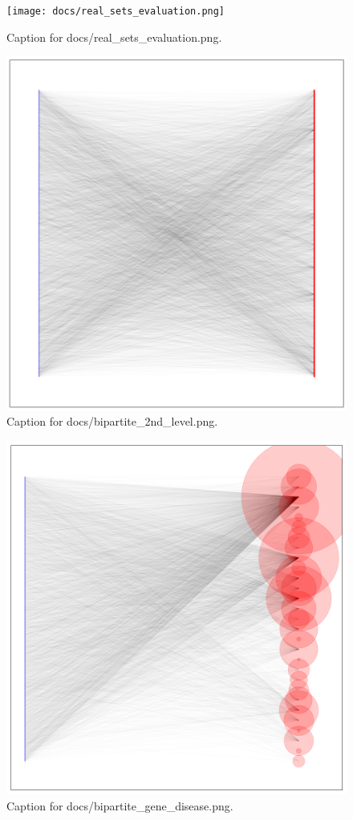 \documentclass{article}
\begin{document}
\begin{figure}[h] \centering \texttt{[image: docs/real\_sets\_evaluation.png]} \caption{Caption for docs/real_sets_evaluation.png.} \end{figure}
\begin{figure}[h] \centering \includegraphics{docs/bipartite_2nd_level.png} \caption{Caption for docs/bipartite_2nd_level.png.} \end{figure}
\begin{figure}[h] \centering \includegraphics{docs/bipartite_gene_disease.png} \caption{Caption for docs/bipartite_gene_disease.png.} \end{figure}
\end{document}
